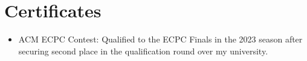 \documentclass[letterpaper,11pt]{article}
\newcommand{\resumeItem}[1]{\item\small{{#1 \vspace{-2pt}}}}
\newcommand{\resumeItemListStart}{\begin{itemize}} %
\newcommand{\resumeItemListEnd}{\end{itemize}\vspace{-5pt}}
\begin{document}
\section{Certificates}
\resumeItemListStart
    \resumeItem{ACM ECPC Contest: Qualified to the ECPC Finals in the 2023 season after securing second place in the qualification round over my university.}
\resumeItemListEnd
\end{document}
